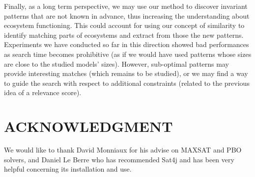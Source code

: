 \documentclass[a4paper,twoside]{article}
\begin{document}
Finally, as a long term perspective, we may use our method to discover invariant patterns that are not known in advance, thus increasing the  understanding about ecosystem functioning. This could account for using our concept of similarity to identify matching parts of ecosystems and extract from those the new patterns. Experiments we have conducted so far in this direction showed bad performances as search time becomes prohibitive (as if we would have used patterns whose sizes are close to the studied models' sizes).  
However, sub-optimal patterns may provide interesting matches (which remains to be studied), or we may find a way to guide the search with respect to additional constraints (related to the previous idea of a relevance score). 





\section*{\uppercase{Acknowledgment}}
We would like to thank David Monniaux for his advise on MAXSAT and
PBO solvers, and Daniel Le Berre who has recommended Sat4j and has
been very helpful concerning its installation and use.



{\small

}
%
\end{document}
